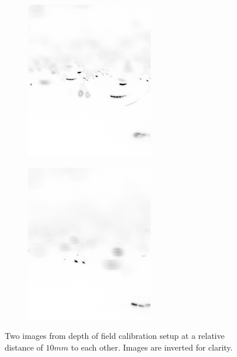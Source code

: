 			\begin{figure}
				\begin{subfigure}[b]{.55\textwidth}
					\centering
					\includegraphics[scale=.8]{images/dof_calib_1.png}
					\caption{}
				\end{subfigure}%
				\begin{subfigure}[b]{.55\textwidth}
					\centering
					\includegraphics[scale=.8]{images/dof_calib_2.png}
					\caption{}
				\end{subfigure}
				\caption{Two images from depth of field calibration setup at a relative distance of $10mm$ to each other. Images are inverted for clarity. }								
				\label{fig:depth_of_field_setup_result}
			\end{figure}
			
			
